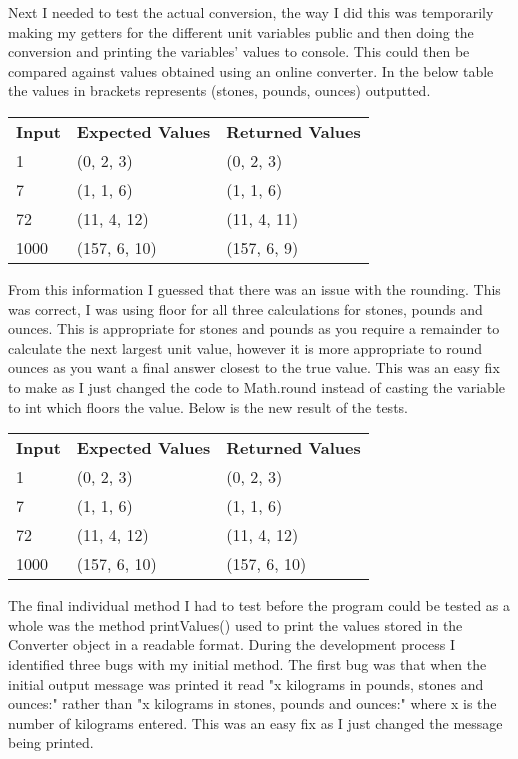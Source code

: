 \documentclass[a4paper]{article}
\begin{document}
Next I needed to test the actual conversion, the way I did this was temporarily making my getters for the different unit variables public and then 
doing the conversion and printing the variables' values to console. This could then be compared against values obtained using an online converter.
In the below table the values in brackets represents (stones, pounds, ounces) outputted.

\begin{table}[H]
\begin{tabular}{lll}
\textbf{Input} & \textbf{Expected Values} & \textbf{Returned Values} \\
1              & (0, 2, 3)                & (0, 2, 3)                \\
7              & (1, 1, 6)                & (1, 1, 6)                \\
72             & (11, 4, 12)              & (11, 4, 11)              \\
1000           & (157, 6, 10)             & (157, 6, 9)
\end{tabular}
\end{table}

From this information I guessed that there was an issue with the rounding. This was correct, I was using floor for all three calculations for stones, 
pounds and ounces. This is appropriate for stones and pounds as you require a remainder to calculate the next largest unit value, however it is more 
appropriate to round ounces as you want a final answer closest to the true value. This was an easy fix to make as I just changed the code to 
Math.round instead of casting the variable to int which floors the value. Below is the new result of the tests.
\begin{table}[H]
\begin{tabular}{lll}
\textbf{Input} & \textbf{Expected Values} & \textbf{Returned Values} \\
1              & (0, 2, 3)                & (0, 2, 3)                \\
7              & (1, 1, 6)                & (1, 1, 6)                \\
72             & (11, 4, 12)              & (11, 4, 12)              \\
1000           & (157, 6, 10)             & (157, 6, 10)
\end{tabular}
\end{table}

The final individual method I had to test before the program could be tested as a whole was the method printValues() used to print the values stored 
in the Converter object in a readable format. During the development process I identified three bugs with my initial method. The first bug was that 
when the initial output message was printed it read "x kilograms in pounds, stones and ounces:" rather than "x kilograms in stones, pounds and 
ounces:" where x is the number of kilograms entered. This was an easy fix as I just changed the message being printed.
\end{document}
